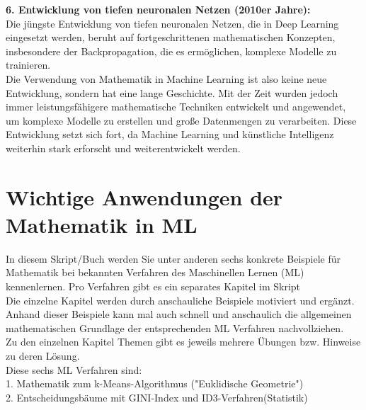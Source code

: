 \documentclass[12pt]{article}
\begin{document}
\textbf{6. Entwicklung von tiefen neuronalen Netzen (2010er Jahre):}\\
Die jüngste Entwicklung von tiefen neuronalen Netzen, die in Deep Learning eingesetzt werden, beruht auf fortgeschrittenen mathematischen Konzepten, insbesondere der Backpropagation, die es ermöglichen, komplexe Modelle zu trainieren.\\[0.3cm]
%
Die Verwendung von Mathematik in Machine Learning ist also keine neue Entwicklung, sondern hat eine lange Geschichte. Mit der Zeit wurden jedoch immer leistungsfähigere mathematische Techniken entwickelt und angewendet, um komplexe Modelle zu erstellen und große Datenmengen zu verarbeiten. Diese Entwicklung setzt sich fort, da Machine Learning und künstliche Intelligenz weiterhin stark erforscht und weiterentwickelt werden.
\\[0.2cm]
%
\newpage
%
\section{Wichtige Anwendungen der Mathematik in ML}

In diesem Skript/Buch werden Sie unter anderen sechs konkrete Beispiele für Mathematik bei bekannten Verfahren des Maschinellen Lernen (ML) kennenlernen. Pro Verfahren gibt es ein separates Kapitel im Skript\\
Die einzelne Kapitel werden durch anschauliche Beispiele motiviert und  ergänzt. Anhand dieser Beispiele kann mal auch schnell und anschaulich die allgemeinen mathematischen Grundlage der entsprechenden ML Verfahren nachvollziehen.\\
Zu den einzelnen Kapitel Themen gibt es jeweils mehrere Übungen bzw. Hinweise zu deren Lösung.\\
Diese sechs ML Verfahren sind:\\


1. Mathematik zum k-Means-Algorithmus ("Euklidische Geometrie")\\

2. Entscheidungsbäume mit GINI-Index und ID3-Verfahren(Statistik)\\
\end{document}

